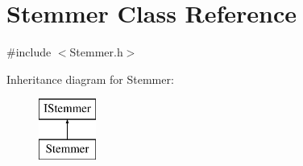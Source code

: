 \hypertarget{classStemmer}{}\section{Stemmer Class Reference}
\label{classStemmer}


{\ttfamily \#include $<$Stemmer.\+h$>$}

Inheritance diagram for Stemmer\+:\begin{figure}[H]
\begin{center}
\leavevmode
\includegraphics[height=2.000000cm]{classStemmer}
\end{center}
\end{figure}
